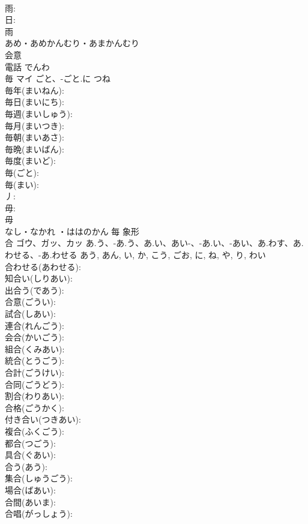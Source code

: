 \documentclass[8pt]{extreport}
\begin{document}
\begin{CJK}{UTF8}{min}
\\	雨: 
\\	日: 
\\	雨	
\\	あめ・あめかんむり・あまかんむり	
\\	会意 
\\	電話 でんわ 
\\	毎	マイ	ごと、-ごと.に	つね	
\\	毎年(まいねん): 
\\	毎日(まいにち): 
\\	毎週(まいしゅう): 
\\	毎月(まいつき): 
\\	毎朝(まいあさ): 
\\	毎晩(まいばん): 
\\	毎度(まいど): 
\\	毎(ごと): 
\\	毎(まい): 
\\	丿: 
\\	毋: 
\\	毋	
\\	なし・なかれ ・ははのかん	每	象形 
\\	合	ゴウ、ガッ、カッ	あ.う、-あ.う、あ.い、あい-、-あ.い、-あい、あ.わす、あ.わせる、-あ.わせる	あう, あん, い, か, こう, ごお, に, ね, や, り, わい	
\\	合わせる(あわせる): 
\\	知合い(しりあい): 
\\	出合う(であう): 
\\	合意(ごうい): 
\\	試合(しあい): 
\\	連合(れんごう): 
\\	会合(かいごう): 
\\	組合(くみあい): 
\\	統合(とうごう): 
\\	合計(ごうけい): 
\\	合同(ごうどう): 
\\	割合(わりあい): 
\\	合格(ごうかく): 
\\	付き合い(つきあい): 
\\	複合(ふくごう): 
\\	都合(つごう): 
\\	具合(ぐあい): 
\\	合う(あう): 
\\	集合(しゅうごう): 
\\	場合(ばあい): 
\\	合間(あいま): 
\\	合唱(がっしょう): 

\end{CJK}
\end{document}
